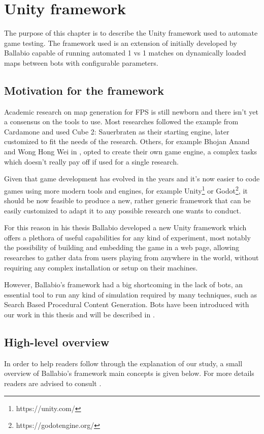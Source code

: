 \chapter{Unity framework}
The purpose of this chapter is to describe the Unity framework used to automate game testing. 
The framework used is an extension of initially developed by Ballabio \cite{ballabio_framework} capable of running automated 1 vs 1 matches on dynamically loaded maps between bots with configurable parameters.

\section{Motivation for the framework}
Academic research on map generation for FPS is still newborn and there isn't yet a consensus on the tools to use. Most researches followed the example from Cardamone and used Cube 2: Sauerbraten as their starting engine, later customized to fit the needs of the research. Others, for example Bhojan Anand and Wong Hong Wei in \cite{bhojan_hong_arena}, opted to create their own game engine, a complex tasks which doesn't really pay off if used for a single research.

Given that game development has evolved in the years and it's now easier to code games using more modern tools and engines, for example Unity\footnote{https://unity.com/} or Godot\footnote{https://godotengine.org/}, it should be now feasible to produce a new, rather generic framework that can be easily customized to adapt it to any possible research one wants to conduct.

For this reason in his thesis Ballabio \citep{ballabio_framework} developed a new Unity framework which offers a plethora of useful capabilities for any kind of experiment, most notably the possibility of building and embedding the game in a web page, allowing researches to gather data from users playing from anywhere in the world, without requiring any complex installation or setup on their machines.

However, Ballabio's framework had a big shortcoming in the lack of bots, an essential tool to run any kind of simulation required by many techniques, such as Search Based Procedural Content Generation. Bots have been introduced with our work in this thesis and will be described in .

\section{High-level overview}
In order to help readers follow through the explanation of our study, a small overview of Ballabio’s framework main concepts is given below. For more details readers are advised to consult \cite{ballabio_framework}.

